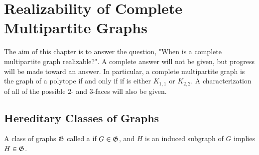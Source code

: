 \chapter{Realizability of Complete Multipartite Graphs}
\label{chap:CompMulti}

The aim of this chapter is to answer the question, "When is a complete multipartite graph realizable?".  A complete answer will not be given, but progress will be made toward an answer.  In particular, a complete multipartite graph is the graph of a polytope if and only if if is either \(K_{1,1}\) or \(K_{2,2}\).  A characterization of all of the possible \(2\)- and \(3\)-faces will also be given.

\section{Hereditary Classes of Graphs}

    A class of graphs \(\mathfrak{G}\) called a  if \(G\in\mathfrak{G}\), and \(H\) is an induced subgraph of \(G\) implies \(H\in\mathfrak{G}\).

